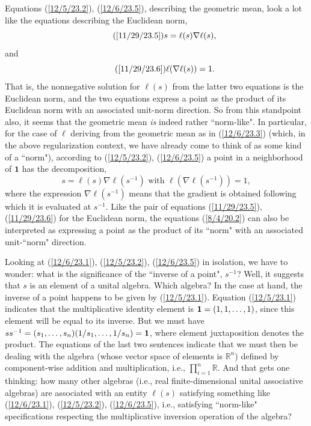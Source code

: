 \documentclass{amsart}
\numberwithin{equation}{section}
\theoremstyle{definition}
\numberwithin{theorem}{section}
\begin{document}
 Equations (\ref{12/5/23.2}), (\ref{12/6/23.5}), describing the geometric mean, look a lot like the equations describing the Euclidean norm,  \begin{equation}\tag{\ref{11/29/23.5}}  s = \ell(s)\nabla\ell(s),\end{equation} and \begin{equation}\tag{\ref{11/29/23.6}} \ell(\nabla\ell(s)) = 1.\end{equation}  That is, the nonnegative solution for $\ell(s)$ from the latter two equations is the Euclidean norm, and the two equations express a point as the product of its Euclidean norm with an associated unit-norm direction.
So from this standpoint also, it seems that the geometric mean {\it is} indeed rather ``norm-like".  In particular, for the case of $\ell$ deriving from the geometric mean as in (\ref{12/6/23.3}) (which, in the above regularization context, we have already come to think of as some kind of a ``norm"), according to (\ref{12/5/23.2}), (\ref{12/6/23.5}) a point in a neighborhood of $\mathbf{1}$ has the decomposition,
\begin{equation}\label{8/4/20.2} s = \ell(s)\nabla \ell(s^{-1}) \mbox{  with   }  \ell(\nabla \ell(s^{-1})) = 1,\end{equation} where the expression $\nabla \ell(s^{-1})$ means that the gradient is obtained following which it is evaluated at $s^{-1}$.  Like the pair of equations (\ref{11/29/23.5}), (\ref{11/29/23.6}) for the Euclidean norm, the equations (\ref{8/4/20.2}) can also be interpreted as expressing a point as the product of its ``norm" with an associated unit-``norm"  direction.


Looking at (\ref{12/6/23.1}), (\ref{12/5/23.2}),  (\ref{12/6/23.5}) in isolation, we have to wonder: what is the significance of the ``inverse of a point", $s^{-1}$?  Well, it suggests that $s$ is an element of a unital algebra.  Which algebra?  In the case at hand, the inverse of a point happens to be given by (\ref{12/5/23.1}).   Equation (\ref{12/5/23.1}) indicates that the multiplicative identity element is ${\bf 1}= (1,1,\dots, 1)$, since this element will be equal to its inverse.  But we must have  $ss^{-1} = (s_1,\dots,s_n)(1/s_1,\dots,1/s_n) = {\bf 1}$, where element juxtaposition denotes the product. The equations of the last two sentences indicate that we must then be dealing with the algebra (whose vector space of elements is $\mathbb{R}^n$) defined by component-wise addition and multiplication, i.e., $\prod_{i=1}^n \mathbb{R}$.  And that gets one thinking: how many other algebras (i.e., real finite-dimensional unital associative algebras) are associated with an entity $\ell(s)$ satisfying something like (\ref{12/6/23.1}), (\ref{12/5/23.2}),  (\ref{12/6/23.5}), i.e., satisfying ``norm-like" specifications respecting the multiplicative inversion operation of the algebra?
 
\end{document}
